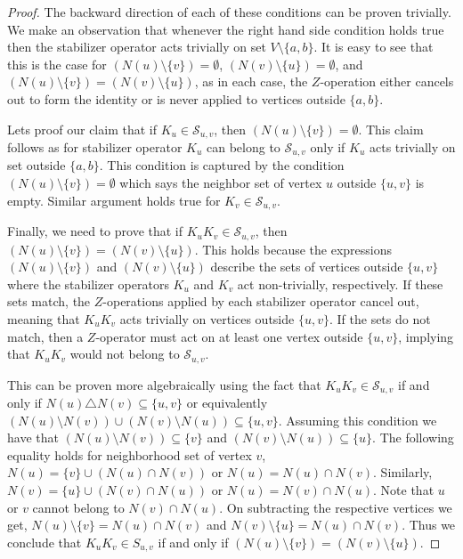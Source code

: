 \documentclass{article}
\begin{document}
\begin{proof}
The backward direction of each of these conditions can be proven trivially. We make an observation that whenever the right hand side condition holds true then the stabilizer operator acts trivially on set $V \setminus \{a, b\}$. It is easy to see that this is the case for $ (N(u) \setminus \{v\}) = \emptyset $, $ (N(v) \setminus \{u\}) = \emptyset $, and $ (N(u) \setminus \{v\}) = (N(v) \setminus \{u\}) $, as in each case, the $ Z $-operation either cancels out to form the identity or is never applied to vertices outside $ \{a, b\} $.

Lets proof our claim that if $K_u \in \mathcal{S}_{u,v}$, then $ (N(u) \setminus \{v\}) = \emptyset $. This claim follows as for stabilizer operator $K_u$ can belong to $ \mathcal{S}_{u,v}$ only if $K_u$ acts trivially on set outside $\{a, b\}$. This condition is captured by the condition  $ (N(u) \setminus \{v\}) = \emptyset $ which says the neighbor set of vertex $u$ outside $\{u, v\}$ is empty. Similar argument holds true for $K_v \in \mathcal{S}_{u,v}$.

Finally, we need to prove that if $ K_u K_v \in \mathcal{S}_{u,v} $, then $ (N(u) \setminus \{v\}) = (N(v) \setminus \{u\}) $. This holds because the expressions $ (N(u) \setminus \{v\}) $ and $ (N(v) \setminus \{u\}) $ describe the sets of vertices outside $ \{u, v\} $ where the stabilizer operators $ K_u $ and $ K_v $ act non-trivially, respectively. If these sets match, the $ Z $-operations applied by each stabilizer operator cancel out, meaning that $ K_u K_v $ acts trivially on vertices outside $ \{u, v\} $. If the sets do not match, then a $ Z $-operator must act on at least one vertex outside $ \{u, v\} $, implying that $ K_u K_v $ would not belong to $ \mathcal{S}_{u,v} $. 


This can be proven more algebraically using the fact that $ K_u K_v \in \mathcal{S}_{u,v} $ if and only if $ N(u) \triangle N(v) \subseteq \{u, v\} $ or equivalently $(N(u) \setminus N(v)) \cup (N(v) \setminus N(u)) \subseteq \{u, v\}$. Assuming this condition we have that $(N(u) \setminus N(v)) \subseteq \{v\}$ and $(N(v) \setminus N(u)) \subseteq \{u\}$. The following equality holds for neighborhood set of vertex $v$, $N(u) = \{v\} \cup (N(u) \cap N(v))$ or $N(u) = N(u) \cap N(v)$. Similarly, $N(v) = \{u\} \cup (N(v) \cap N(u))$ or $N(u) = N(v) \cap N(u)$. Note that $u$ or $v$ cannot belong to $N(v) \cap N(u)$. On subtracting the respective vertices we get, $N(u) \setminus \{v\}= N(u) \cap N(v)$ and $N(v) \setminus \{u\}= N(u) \cap N(v)$. Thus we conclude that $ K_u K_v \in S_{u,v} $ if and only if $ (N(u) \setminus \{v\}) = (N(v) \setminus \{u\}) $.

\end{proof}
\end{document}
